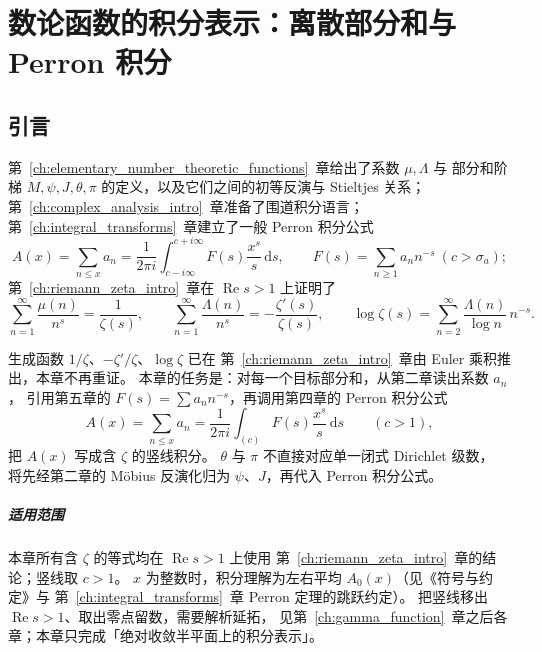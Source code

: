 
\chapter{数论函数的积分表示：离散部分和与 Perron 积分}\label{ch:discrete_continuous}
\label{ch:perron_nt_summary}

\section{引言}\label{sec:intro_discrete_continuous}

第~\ref{ch:elementary_number_theoretic_functions}~章给出了系数 $\mu,\Lambda$ 与
部分和阶梯 $M,\psi,J,\theta,\pi$ 的定义，以及它们之间的初等反演与
Stieltjes 关系；第~\ref{ch:complex_analysis_intro}~章准备了围道积分语言；
第~\ref{ch:integral_transforms}~章建立了一般 Perron 积分公式
\[
  A(x)=\sum_{n\le x}a_n
  =\frac{1}{2\pi i}\int_{c-i\infty}^{c+i\infty} F(s)\frac{x^s}{s}\,\mathrm{d}s,
  \qquad
  F(s)=\sum_{n\ge 1}a_n n^{-s}\ (c>\sigma_a);
\]
第~\ref{ch:riemann_zeta_intro}~章在 $\operatorname{Re}s>1$ 上证明了
\[
  \sum_{n=1}^{\infty}\frac{\mu(n)}{n^{s}}=\frac{1}{\zeta(s)},
  \qquad
  \sum_{n=1}^{\infty}\frac{\Lambda(n)}{n^{s}}=-\frac{\zeta'(s)}{\zeta(s)},
  \qquad
  \log\zeta(s)=\sum_{n=2}^{\infty}\frac{\Lambda(n)}{\log n}\,n^{-s}.
\]

生成函数 $1/\zeta$、$-\zeta'/\zeta$、$\log\zeta$ 已在
第~\ref{ch:riemann_zeta_intro}~章由 Euler 乘积推出，本章不再重证。
本章的任务是：对每一个目标部分和，从第二章读出系数 $a_n$，
引用第五章的 $F(s)=\sum a_n n^{-s}$，再调用第四章的 Perron 积分公式
\[
  A(x)=\sum_{n\le x}a_n
  =\frac{1}{2\pi i}\int_{(c)} F(s)\frac{x^s}{s}\,\mathrm{d}s
  \qquad(c>1),
\]
把 $A(x)$ 写成含 $\zeta$ 的竖线积分。
$\theta$ 与 $\pi$ 不直接对应单一闭式 Dirichlet 级数，
将先经第二章的 Möbius 反演化归为 $\psi$、$J$，再代入 Perron 积分公式。

\paragraph{适用范围}
本章所有含 $\zeta$ 的等式均在 $\operatorname{Re}s>1$ 上使用
第~\ref{ch:riemann_zeta_intro}~章的结论；竖线取 $c>1$。
$x$ 为整数时，积分理解为左右平均 $A_0(x)$（见《符号与约定》与
第~\ref{ch:integral_transforms}~章 Perron 定理的跳跃约定）。
把竖线移出 $\operatorname{Re}s>1$、取出零点留数，需要解析延拓，
见第~\ref{ch:gamma_function}~章之后各章；本章只完成「绝对收敛半平面上的积分表示」。


